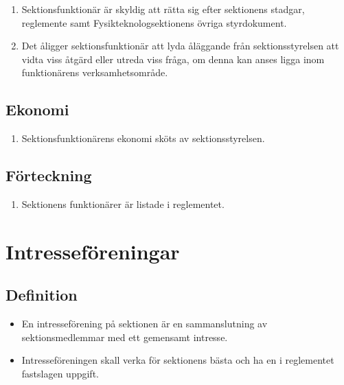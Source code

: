 \documentclass[11pt,a4paper]{article}
\begin{document}
\begin{enumerate}[\thesubsection.1]

  \item Sektionsfunktionär är skyldig att rätta sig efter sektionens
  stadgar, reglemente samt Fysikteknologsektionens övriga styrdokument. 

  \item Det åligger sektionsfunktionär att lyda åläggande från
  sektions\-styrel\-sen att vidta viss åtgärd eller utreda viss fråga, om denna kan anses ligga inom funktionärens verksamhetsområde.

\end{enumerate}

\subsection{Ekonomi}

\begin{enumerate}[\thesubsection.1]

  \item Sektionsfunktionärens ekonomi sköts av sektionsstyrelsen.

\end{enumerate}

\subsection{Förteckning}

\begin{enumerate}[\thesubsection.1]


\item Sektionens funktionärer är listade i reglementet.
\end{enumerate}

\newpage



\section{Intresseföreningar}


\subsection{Definition}

\begin{itemize}

  \item En intresseförening på sektionen är en samman\-slutning av sektions\-medlemmar med ett gemensamt intresse.

  \item Intresseföreningen skall verka för sektionens bästa och ha en
  i reglementet fastslagen uppgift.

\end{itemize}
\end{document}

